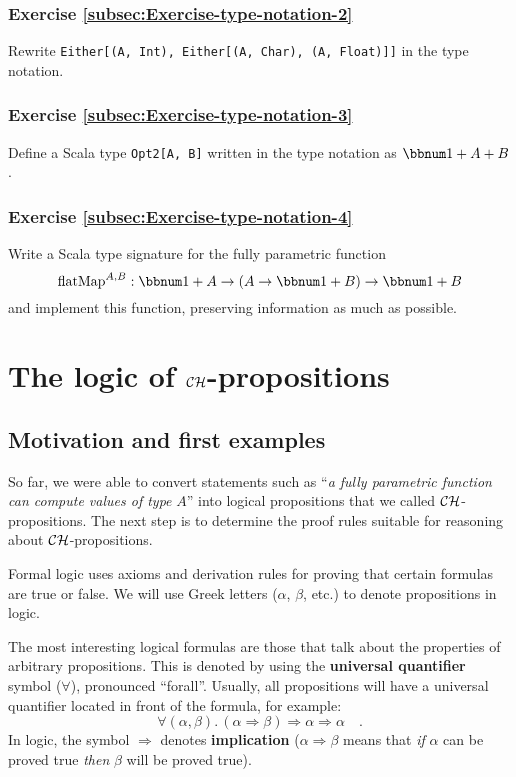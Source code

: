 \subsubsection{Exercise \label{subsec:Exercise-type-notation-2}\ref{subsec:Exercise-type-notation-2}}

Rewrite \lstinline!Either[(A, Int), Either[(A, Char), (A, Float)]]!
in the type notation. 

\subsubsection{Exercise \label{subsec:Exercise-type-notation-3}\ref{subsec:Exercise-type-notation-3}}

Define a Scala type \lstinline!Opt2[A, B]! written in the type notation
as $\bbnum 1+A+B$.

\subsubsection{Exercise \label{subsec:Exercise-type-notation-4}\ref{subsec:Exercise-type-notation-4}}

Write a Scala type signature for the fully parametric function 
\[
\text{flatMap}^{A,B}:\bbnum 1+A\rightarrow\left(A\rightarrow\bbnum 1+B\right)\rightarrow\bbnum 1+B
\]
and implement this function, preserving information as much as possible.

\section{The logic of ${\cal CH}$-propositions}

\subsection{Motivation and first examples\label{subsec:ch-Motivation-and-first-examples}}

So far, we were able to convert statements such as \textsf{``}\emph{a fully
parametric function can compute values of type} $A$\textsf{''} into logical
propositions that we called ${\cal CH}$-propositions. The next step
is to determine the proof rules suitable for reasoning about ${\cal CH}$-propositions.

Formal logic uses axioms and derivation rules for proving that certain
formulas are true or false. We will use Greek letters ($\alpha$,
$\beta$, etc.) to denote propositions in logic.

The most interesting logical formulas are those that talk about the
properties of arbitrary propositions. This is denoted by using the
\textbf{universal quantifier} symbol
($\forall$), pronounced \textsf{``}forall\textsf{''}. Usually, all propositions will
have a universal quantifier located in front of the formula, for example:
\[
\forall(\alpha,\beta).\,\left(\alpha\Rightarrow\beta\right)\Rightarrow\alpha\Rightarrow\alpha\quad.
\]
In logic, the symbol $\Rightarrow$ denotes \textbf{implication}
($\alpha\Rightarrow\beta$ means that \emph{if} $\alpha$ can be proved
true \emph{then} $\beta$ will be proved true).

